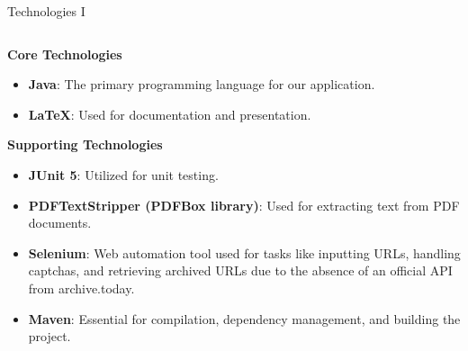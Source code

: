 \documentclass[
    ngerman,%
    authorontitle=true,
]{bfhbeamer}
\begin{document}
    \begin{frame}{Technologies I}
        \begin{columns}
            \begin{column}{0.7\textwidth}
                \textbf{Core Technologies}
                \begin{itemize}
                    \item \textbf{Java}: The primary programming language for our application.
                    \item \textbf{LaTeX}: Used for documentation and presentation.
                \end{itemize}

                \vspace{1em} %

                \textbf{Supporting Technologies}
                \begin{itemize}
                    \item \textbf{JUnit 5}: Utilized for unit testing.
                    \item \textbf{PDFTextStripper (PDFBox library)}: Used for extracting text from PDF documents.
                    \item \textbf{Selenium}: Web automation tool used for tasks like inputting URLs, handling captchas, and retrieving archived URLs due to the absence of an official API from archive.today.
                    \item \textbf{Maven}: Essential for compilation, dependency management, and building the project.
                \end{itemize}
            \end{column}


\end{columns}
\end{frame}
\end{document}
